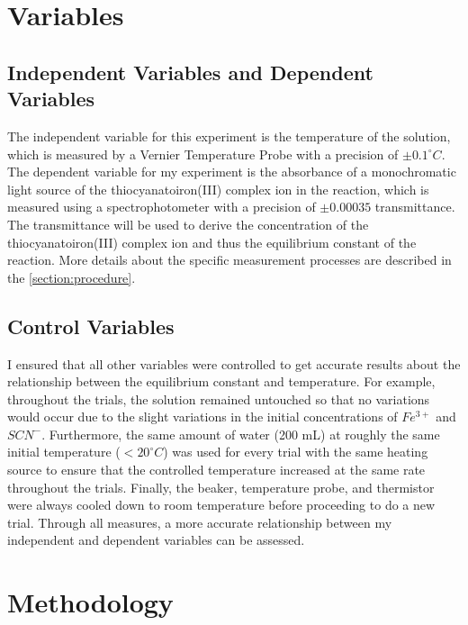 \section{Variables}
\subsection{Independent Variables and Dependent Variables}
The independent variable for this experiment is the temperature of the solution, which is measured by a Vernier Temperature Probe with a precision of $\pm 0.1^\circ C$. The dependent variable for my experiment is the absorbance of a monochromatic light source of the thiocyanatoiron(III) complex ion in the reaction, which is measured using a spectrophotometer with a precision of $\pm 0.00035$ transmittance. The transmittance will be used to derive the concentration of the thiocyanatoiron(III) complex ion and thus the equilibrium constant of the reaction. More details about the specific measurement processes are described in the \cref{section:procedure}.

\subsection{Control Variables}
I ensured that all other variables were controlled to get accurate results about the relationship between the equilibrium constant and temperature. For example, throughout the trials, the solution remained untouched so that no variations would occur due to the slight variations in the initial concentrations of \(Fe^{3+}\) and \(SCN^-\). Furthermore, the same amount of water (200 mL) at roughly the same initial temperature ($<20^\circ C$) was used for every trial with the same heating source to ensure that the controlled temperature increased at the same rate throughout the trials. Finally, the beaker, temperature probe, and thermistor were always cooled down to room temperature before proceeding to do a new trial. Through all measures, a more accurate relationship between my independent and dependent variables can be assessed.

\section{Methodology}
